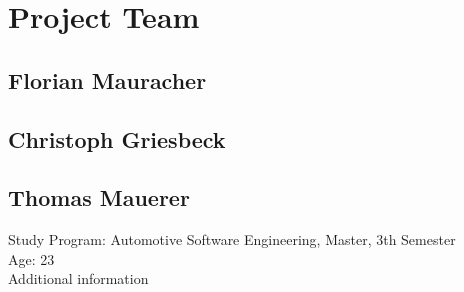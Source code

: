 \section{Project Team}
\subsection{Florian Mauracher}

\subsection{Christoph Griesbeck}

\subsection{Thomas Mauerer}
Study Program: Automotive Software Engineering, Master, 3th Semester \\
Age: 23 \\
Additional information 
